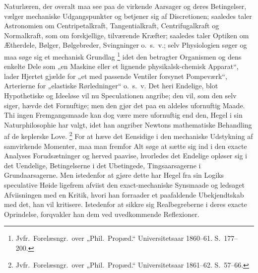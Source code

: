 \documentclass[12pt]{book}
\newcommand{\opage}[1]{\marginnote{\footnotesize\textit{[#1]}}}
\begin{document}
Naturlæren, der overalt maa see paa de virkende Aarsager og deres Betingelser, vælger
mechaniske Udgangspunkter og betjener sig af Discretionen; saaledes taler Astronomien om
Centripetalkraft, Tangentialkraft, Centrifugalkraft og Normalkraft, som om forskjellige,
tilværende Kræfter; saaledes taler Optiken om Ætherdele, Bølger, Bølgebreder, Svingninger
o.\ s.\ v.; selv Physiologien søger og maa søge sig et mechanisk Grundlag%
\footnote{Jvfr.\ Forelæsngr.\ over „Phil.\ Propæd.“ Universitetsaar 1860--61. S.~177--200.}
idet den betragter Organismen og dens enkelte Dele som „en Maskine eller et lignende
physikalsk-chemisk Apparat“, lader Hjertet gjælde for „et med passende Ventiler forsynet
Pompeværk“, Arterierne for „elastiske Rørledninger“ o.\ s.\ v. Det heri Endelige, blot
Hypothetiske og Ideeløse vil nu Speculationen angribe; den vil, som den selv siger, hævde
det Fornuftige; men den gjør det paa en aldeles ufornuftig Maade. Thi ingen
Fremgangsmaade kan dog være mere ufornuftig end den, Hegel i sin Naturphilosophie har
valgt, idet han angriber Newtons mathematiske Behandling af de keplerske Love.%
\footnote{Jvfr.\ Forelæsngr.\ over „Phil.\ Propæd.“ Universitetsaar 1861--62. S.~57--66.}
For at hæve det Eensidige i den mechaniske Udstykning af samvirkende Momenter, maa man
fremfor Alt søge at sætte sig ind i den exacte Analyses Forudsætninger og herved paavise,
hvorledes det Endelige opløser sig i det Uendelige, Betingelserne i det Ubetingede,
Tingsaarsagerne i Grundaarsagerne. Men istedenfor at gjøre dette har Hegel fra sin Logiks
speculative Høide ligefrem afviist den exact-mechaniske Synsmaade og ledsaget Afviisningen
med en Kritik, hvori han forraader et paafaldende Ubekjendtskab med det, han vil kritisere.
Istedenfor at sikkre sig Realbegreberne i deres exacte
\opage{356} Oprindelse, forqvakler han dem ved uvedkommende Reflexioner.
\end{document}
